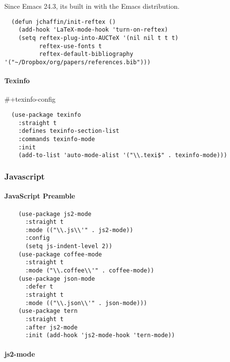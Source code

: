 \documentclass[11pt]{article}
\begin{document}
Since Emacs 24.3, its built in with the Emacs distribution.

\begin{verbatim}
  (defun jchaffin/init-reftex ()
    (add-hook 'LaTeX-mode-hook 'turn-on-reftex)
    (setq reftex-plug-into-AUCTeX '(nil nil t t t)
          reftex-use-fonts t
          reftex-default-bibliography '("~/Dropbox/org/papers/references.bib")))
\end{verbatim}

\paragraph*{Texinfo}
\label{sec:orgd281516}

\#+texinfo-config
\begin{verbatim}
  (use-package texinfo
    :straight t
    :defines texinfo-section-list
    :commands texinfo-mode
    :init
    (add-to-list 'auto-mode-alist '("\\.texi$" . texinfo-mode)))
\end{verbatim}

\subsubsection*{Javascript}
\label{sec:org556ea14}
\paragraph*{JavaScript Preamble}
\label{sec:orgcfef13f}

\begin{verbatim}
    (use-package js2-mode
      :straight t
      :mode (("\\.js\\'" . js2-mode))
      :config
      (setq js-indent-level 2))
    (use-package coffee-mode
      :straight t
      :mode ("\\.coffee\\'" . coffee-mode))
    (use-package json-mode
      :defer t
      :straight t
      :mode (("\\.json\\'" . json-mode)))
    (use-package tern
      :straight t
      :after js2-mode
      :init (add-hook 'js2-mode-hook 'tern-mode))
\end{verbatim}

\paragraph*{js2-mode}
\label{sec:orgbe18e11}
\end{document}
